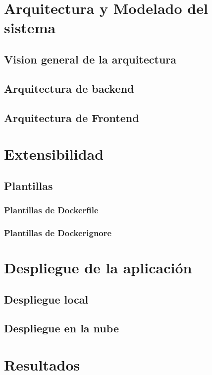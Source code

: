 \documentclass[12pt, a4paper, twoside]{article}
\begin{document}
\section{Arquitectura y Modelado del sistema }
\subsection{Vision general de la arquitectura }
\subsection{Arquitectura de backend}
\subsection{Arquitectura de Frontend}



\section{Extensibilidad}
\subsection{Plantillas}
\subsubsection{Plantillas de Dockerfile}
\subsubsection{Plantillas de Dockerignore}


\section{Despliegue de la aplicación  }
\subsection{ Despliegue local }
\subsection{ Despliegue en la nube }


\section{Resultados}
\end{document}

